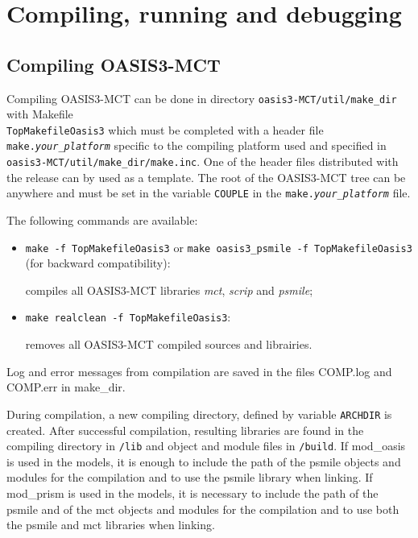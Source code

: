 \newpage
%

\chapter{Compiling, running and debugging}
\label{sec_compilationrunning}

\section{Compiling OASIS3-MCT}
\label{subsec_compile}

Compiling OASIS3-MCT can be done in directory {\tt oasis3-MCT/util/make\_dir}
with Makefile \\ {\tt TopMakefileOasis3} which must be completed with a header file {\tt
  make.{\it your\_platform}} specific to the compiling platform used
and specified in {\tt oasis3-MCT/util/make\_dir/make.inc}.  One of the
header files distributed with the release can by used as a template.  The root 
of the OASIS3-MCT tree
can be anywhere and must be set in the variable {\tt COUPLE} in the
{\tt make.{\it your\_platform}} file. 

The following commands are available:

\begin{itemize}
\item {\tt make -f TopMakefileOasis3} or {\tt make oasis3\_psmile -f
  TopMakefileOasis3} (for backward compatibility):

  compiles all OASIS3-MCT libraries {\it mct}, {\it scrip} and {\it psmile}; 

\item {\tt make realclean -f  TopMakefileOasis3}: 

  removes all OASIS3-MCT compiled sources and librairies.

\end{itemize}

Log and error messages from compilation are saved in the files
COMP.log and COMP.err in make\_dir.

During compilation, a new compiling directory, defined by variable {\tt ARCHDIR}
is created.  After successful
compilation, resulting libraries are found in the compiling directory in {\tt /lib} and object
and module files in {\tt /build}. If mod\_oasis is used in the models, it is enough to include the path of the psmile
objects and modules for the compilation and to use the psmile library when linking. If mod\_prism is used in the models, it is 
necessary to include the path of the psmile and of the mct objects and modules for the compilation and to use both the psmile and 
mct libraries when linking.

